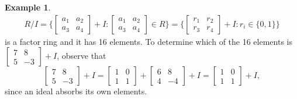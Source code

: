 \documentclass{article}
\theoremstyle{definition}
\newtheorem{example}{Example}[section]
\begin{document}
\begin{example}
    \begin{align*}
        R/I=\bigg\{\begin{bmatrix}
                        a_1 & a_2 \\
                        a_3 & a_4
                    \end{bmatrix}+I: 
                    \begin{bmatrix}
                        a_1 & a_2 \\
                        a_3 & a_4
                    \end{bmatrix} \in R\bigg\} 
        =\bigg\{\begin{bmatrix}
                    r_1 & r_2 \\
                    r_3 & r_4
                \end{bmatrix}+I: r_i \in \{0,1\}\bigg\}
    \end{align*}
    is a factor ring and it has 16 elements. To determine which of the 16 elements is $\begin{bmatrix}
       7 & 8 \\
       5 & -3
    \end{bmatrix}+I$, observe that
    \begin{equation*}
        \begin{bmatrix}
           7 & 8 \\
           5 & -3
        \end{bmatrix}+I = \begin{bmatrix}
           1 & 0 \\
           1 & 1
        \end{bmatrix}+
        \begin{bmatrix}
           6 & 8 \\
           4 & -4
        \end{bmatrix}+I=
        \begin{bmatrix}
           1 & 0 \\
           1 & 1
        \end{bmatrix}+I,
    \end{equation*}
    since an ideal absorbs its own elements.
\end{example}
\end{document}
